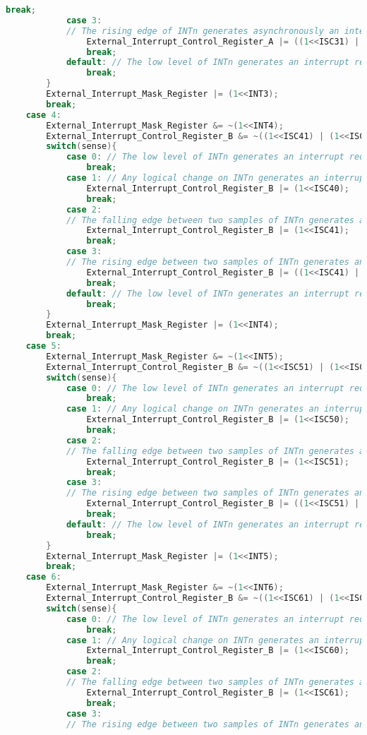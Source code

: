 \begin{lstlisting}[language=C, caption={atmega128interrupt.c}, label=atmega128interrupt-c, captionpos=b]
				break;
			case 3: 
			// The rising edge of INTn generates asynchronously an interrupt request.
				External_Interrupt_Control_Register_A |= ((1<<ISC31) | (1<<ISC30));
				break;
			default: // The low level of INTn generates an interrupt request.
				break;
		}
		External_Interrupt_Mask_Register |= (1<<INT3);
		break;
	case 4:
		External_Interrupt_Mask_Register &= ~(1<<INT4);
		External_Interrupt_Control_Register_B &= ~((1<<ISC41) | (1<<ISC40));
		switch(sense){
			case 0: // The low level of INTn generates an interrupt request.
				break;
			case 1: // Any logical change on INTn generates an interrupt request
				External_Interrupt_Control_Register_B |= (1<<ISC40);
				break;
			case 2: 
			// The falling edge between two samples of INTn generates an interrupt request.
				External_Interrupt_Control_Register_B |= (1<<ISC41);
				break;
			case 3: 
			// The rising edge between two samples of INTn generates an interrupt request.
				External_Interrupt_Control_Register_B |= ((1<<ISC41) | (1<<ISC40));
				break;
			default: // The low level of INTn generates an interrupt request.
				break;
		}
		External_Interrupt_Mask_Register |= (1<<INT4);
		break;
	case 5:
		External_Interrupt_Mask_Register &= ~(1<<INT5);
		External_Interrupt_Control_Register_B &= ~((1<<ISC51) | (1<<ISC50));
		switch(sense){
			case 0: // The low level of INTn generates an interrupt request.
				break;
			case 1: // Any logical change on INTn generates an interrupt request
				External_Interrupt_Control_Register_B |= (1<<ISC50);
				break;
			case 2: 
			// The falling edge between two samples of INTn generates an interrupt request.
				External_Interrupt_Control_Register_B |= (1<<ISC51);
				break;
			case 3: 
			// The rising edge between two samples of INTn generates an interrupt request.
				External_Interrupt_Control_Register_B |= ((1<<ISC51) | (1<<ISC50));
				break;
			default: // The low level of INTn generates an interrupt request.
				break;
		}
		External_Interrupt_Mask_Register |= (1<<INT5);
		break;
	case 6:
		External_Interrupt_Mask_Register &= ~(1<<INT6);
		External_Interrupt_Control_Register_B &= ~((1<<ISC61) | (1<<ISC60));
		switch(sense){
			case 0: // The low level of INTn generates an interrupt request.
				break;
			case 1: // Any logical change on INTn generates an interrupt request
				External_Interrupt_Control_Register_B |= (1<<ISC60);
				break;
			case 2: 
			// The falling edge between two samples of INTn generates an interrupt request.
				External_Interrupt_Control_Register_B |= (1<<ISC61);
				break;
			case 3: 
			// The rising edge between two samples of INTn generates an interrupt request.

\end{lstlisting}
